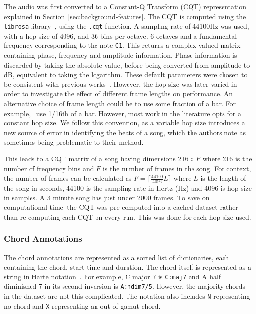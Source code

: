 The audio was first converted to a Constant-Q Transform (CQT) representation explained in Section~\ref{sec:background-features}. The CQT is computed using the \texttt{librosa} library~\citep{librosa}, using the \texttt{.cqt} function. A sampling rate of 44100Hz was used, with a hop size of 4096, and 36 bins per octave, 6 octaves and a fundamental frequency corresponding to the note \texttt{C1}. This returns a complex-valued matrix containing phase, frequency and amplitude information. Phase information is discarded by taking the absolute value, before being converted from amplitude to dB, equivalent to taking the logarithm.  These default parameters were chosen to be consistent with previous works~\citep{StructuredTraining}. However, the hop size was later varied in order to investigate the effect of different frame lengths on performance. An alternative choice of frame length could be to use some fraction of a bar. For example,~\citet{MelodyTranscriptionViaGenerativePreTraining} use 1/16th of a bar. However, most work in the literature opts for a constant hop size. We follow this convention, as a variable hop size introduces a new source of error in identifying the beats of a song, which the authors note as sometimes being problematic to their method. 

This leads to a CQT matrix of a song having dimensions $216 \times F$ where 216 is the number of frequency bins and $F$ is the number of frames in the song. For context, the number of frames can be calculated as $F = \lceil \frac{44100}{4096} L  \rceil$ where $L$ is the length of the song in seconds, 44100 is the sampling rate in Hertz (Hz) and 4096 is hop size in samples. A 3 minute song has just under 2000 frames. To save on computational time, the CQT was pre-computed into a cached dataset rather than re-computing each CQT on every run. This was done for each hop size used.

\subsubsection{Chord Annotations}

The chord annotations are represented as a sorted list of dictionaries, each containing the chord, start time and duration. The chord itself is represented as a string in Harte notation~\citep{HarteNotation}. For example, C major 7 is \texttt{C:maj7} and A half diminished 7 in its second inversion is \texttt{A:hdim7/5}. However, the majority chords in the dataset are not this complicated. The notation also includes \texttt{N} representing no chord and \texttt{X} representing an out of gamut chord. 

